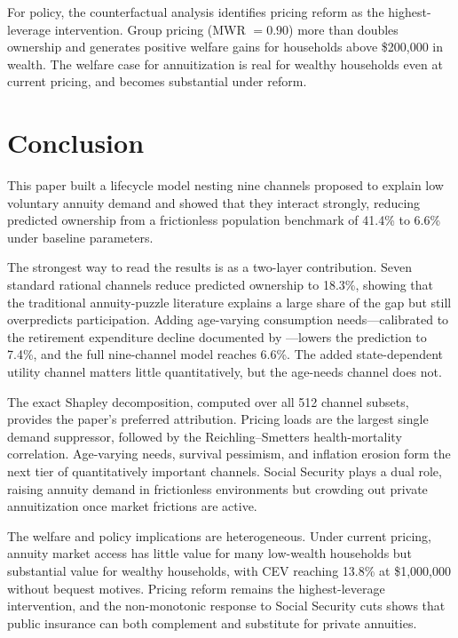 \documentclass[12pt]{article}
\begin{document}
For policy, the counterfactual analysis identifies pricing reform as the highest-leverage intervention. Group pricing (MWR $= 0.90$) more than doubles ownership and generates positive welfare gains for households above \$200,000 in wealth. The welfare case for annuitization is real for wealthy households even at current pricing, and becomes substantial under reform.


\section{Conclusion}
\label{sec:conclusion}

This paper built a lifecycle model nesting nine channels proposed to explain low voluntary annuity demand and showed that they interact strongly, reducing predicted ownership from a frictionless population benchmark of 41.4\% to 6.6\% under baseline parameters.

The strongest way to read the results is as a two-layer contribution. Seven standard rational channels reduce predicted ownership to 18.3\%, showing that the traditional annuity-puzzle literature explains a large share of the gap but still overpredicts participation. Adding age-varying consumption needs---calibrated to the retirement expenditure decline documented by \citet{aguiarhurst2013}---lowers the prediction to 7.4\%, and the full nine-channel model reaches 6.6\%. The added state-dependent utility channel matters little quantitatively, but the age-needs channel does not.

The exact Shapley decomposition, computed over all 512 channel subsets, provides the paper's preferred attribution. Pricing loads are the largest single demand suppressor, followed by the Reichling--Smetters health-mortality correlation. Age-varying needs, survival pessimism, and inflation erosion form the next tier of quantitatively important channels. Social Security plays a dual role, raising annuity demand in frictionless environments but crowding out private annuitization once market frictions are active.

The welfare and policy implications are heterogeneous. Under current pricing, annuity market access has little value for many low-wealth households but substantial value for wealthy households, with CEV reaching 13.8\% at \$1,000,000 without bequest motives. Pricing reform remains the highest-leverage intervention, and the non-monotonic response to Social Security cuts shows that public insurance can both complement and substitute for private annuities.
\end{document}
